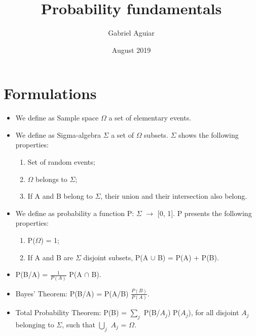 \documentclass{article}
\title{Probability fundamentals}
\author{Gabriel Aguiar}
\date{August 2019}
\begin{document}
\maketitle

\section{Formulations}

\begin{itemize}
    
\item We define as Sample space $\Omega$ a set of elementary events.

\item We define as Sigma-algebra $\Sigma$ a set of $\Omega$ subsets. $\Sigma$ shows the following properties:

\begin{enumerate}

\item Set of random events;

\item $\Omega$ belongs to $\Sigma$;

\item If A and B belong to $\Sigma$, their union and their intersection also belong.

\end{enumerate}
        
\item We define as probability a function P: $\Sigma$ $\rightarrow$ [0, 1]. P presents the following properties:

\begin{enumerate}

\item P($\Omega$) = 1; 

\item If A and B are $\Sigma$ disjoint subsets, P(A $\cup$ B) = P(A) + P(B).

\end{enumerate}

\item P(B/A) = $\frac{1}{P(A)}$ P(A $\cap$ B).

\item Bayes' Theorem: P(B/A) = P(A/B) $\frac{P(B)}{P(A)}$.

\item Total Probability Theorem: P(B) = $\sum\limits_{j}$ P(B/$A_{j}$) P($A_{j}$), for all disjoint $A_{j}$ belonging to $\Sigma$, such that $\bigcup\limits_{j}$ $A_{j}$ = $\Omega$.



        
\end{itemize}
\end{document}
